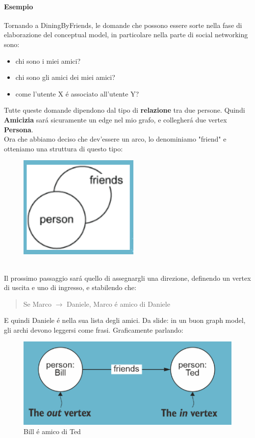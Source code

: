 \paragraph{Esempio} Tornando a DiningByFriends, le domande che possono essere sorte nella fase di elaborazione del conceptual model, in particolare nella parte di social networking sono:
\begin{itemize}
    \item chi sono i miei amici?
    \item chi sono gli amici dei miei amici?
    \item come l'utente X é associato all'utente Y?
\end{itemize}
Tutte queste domande dipendono dal tipo di \textbf{relazione} tra due persone. Quindi \textbf{Amicizia} sará sicuramente un edge nel mio grafo, e collegherá due vertex \textbf{Persona}. 
\\
Ora che abbiamo deciso che dev'essere un arco, lo denominiamo "friend" e otteniamo una struttura di questo tipo: 
\\
\begin{figure}[th]
    \centering
    \includegraphics[width=0.25\linewidth]{GraphModeling//img/friend.png}
\end{figure}
\\
Il prossimo passaggio sará quello di assegnargli una direzione, definendo un vertex di uscita e uno di ingresso, e stabilendo che:
\begin{quote}
    Se Marco $\rightarrow$ Daniele, Marco é amico di Daniele 
\end{quote}
E quindi Daniele é nella sua lista degli amici. Da slide: in un buon graph model, gli archi devono leggersi come frasi. Graficamente parlando:
\\
\begin{figure}[th]
    \centering
    \includegraphics[width=0.5\linewidth]{GraphModeling//img/billfriendsted.png}
    \caption{Bill é amico di Ted}
\end{figure}

